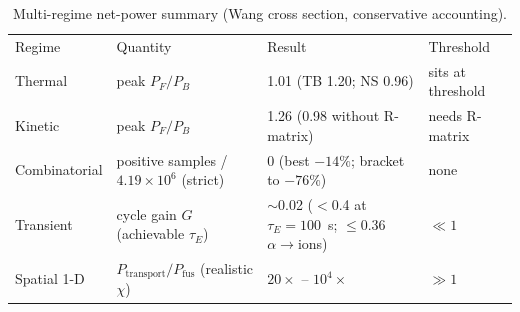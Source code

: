 \documentclass[aip,pop,reprint,amsmath,amssymb,floatfix]{revtex4-2}
\begin{document}
\begin{table}
\caption{Multi-regime net-power summary (Wang cross section, conservative accounting).}
\label{tab:multiregime}
\begin{ruledtabular}
\begin{tabular}{llll}
Regime & Quantity & Result & Threshold \\
\colrule
Thermal & peak $P_F/P_B$ & 1.01 (TB 1.20; NS 0.96) & sits at threshold \\
Kinetic & peak $P_F/P_B$ & 1.26 (0.98 without R-matrix) & needs R-matrix \\
Combinatorial & positive samples / $4.19\times10^6$ (strict) & 0 (best $-14\%$; bracket to $-76\%$) & none \\
Transient & cycle gain $G$ (achievable $\tau_E$) & $\sim$0.02 ($<$0.4 at $\tau_E=100$~s; $\le$0.36 $\alpha\to$ions) & $\ll 1$ \\
Spatial 1-D & $P_\mathrm{transport}/P_\mathrm{fus}$ (realistic $\chi$) & $20\times$ -- $10^4\times$ & $\gg 1$ \\
\end{tabular}
\end{ruledtabular}
\end{table}
\end{document}
